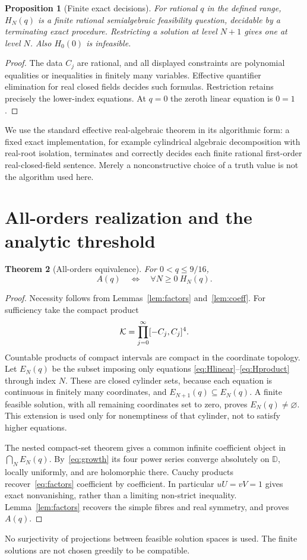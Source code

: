 \documentclass[11pt,a4paper]{article}
\newtheorem{theorem}{Theorem}[section]
\newtheorem{proposition}[theorem]{Proposition}
\theoremstyle{definition}\newtheorem{definition}[theorem]{Definition}
\theoremstyle{remark}\newtheorem{remark}[theorem]{Remark}
\newcommand{\D}{\mathbb D}\newcommand{\R}{\mathbb R}
\begin{document}
\begin{proposition}[Finite exact decisions]\label{prop:decide}
For rational $q$ in the defined range, $H_N(q)$ is a finite rational
semialgebraic feasibility question, decidable by a terminating exact
procedure. Restricting a solution at level $N+1$ gives one at level $N$.
Also $H_0(0)$ is infeasible.
\end{proposition}
\begin{proof}
The data $C_j$ are rational, and all displayed constraints are polynomial
equalities or inequalities in finitely many variables. Effective
quantifier elimination for real closed fields decides such formulas.
Restriction retains precisely the lower-index equations. At $q=0$ the
zeroth linear equation is $0=1$.
\end{proof}
We use the standard effective real-algebraic theorem in its algorithmic
form: a fixed exact implementation, for example cylindrical algebraic
decomposition with real-root isolation, terminates and correctly decides
each finite rational first-order real-closed-field sentence. Merely a
nonconstructive choice of a truth value is not the algorithm used here.

\section{All-orders realization and the analytic threshold}\label{sec:realization}
\begin{theorem}[All-orders equivalence]\label{thm:allorders}
For $0<q\leq9/16$,
\begin{equation}\label{eq:allorders}
 A(q)\quad\Longleftrightarrow\quad\forall N\geq0\ H_N(q).
\end{equation}
\end{theorem}
\begin{proof}
Necessity follows from Lemmas~\ref{lem:factors} and~\ref{lem:coeff}.
For sufficiency take the compact product
\[
 \mathcal K=\prod_{j=0}^{\infty}[-C_j,C_j]^4.
\]
Countable products of compact intervals are compact in the coordinate
topology. Let $E_N(q)$ be the subset imposing only equations
\eqref{eq:Hlinear}--\eqref{eq:Hproduct} through index $N$. These are
closed cylinder sets, because each equation is continuous in finitely
many coordinates, and $E_{N+1}(q)\subseteq E_N(q)$. A finite feasible
solution, with all remaining coordinates set to zero, proves
$E_N(q)\ne\varnothing$. This extension is used only for nonemptiness
of that cylinder, not to satisfy higher equations.

The nested compact-set theorem gives a common infinite coefficient
object in $\bigcap_NE_N(q)$. By~\eqref{eq:growth} its four power series
converge absolutely on $\D$, locally uniformly, and are holomorphic
there. Cauchy products recover~\eqref{eq:factors} coefficient by
coefficient. In particular $uU=vV=1$ gives exact nonvanishing, rather
than a limiting non-strict inequality. Lemma~\ref{lem:factors} recovers
the simple fibres and real symmetry, and proves $A(q)$.
\end{proof}
No surjectivity of projections between feasible solution spaces is used.
The finite solutions are not chosen greedily to be compatible.
\end{document}

